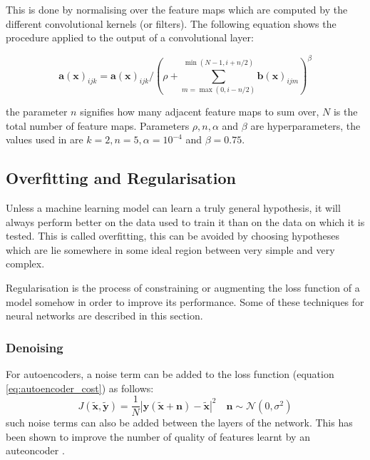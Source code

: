     This is done by normalising over the feature maps which are computed by the different convolutional kernels (or filters).
    The following equation shows the procedure applied to the output of a convolutional layer:

    \begin{equation} \label{eq:lrn}
      \mathbf{a}(\mathbf{x})_{ijk}
      = \mathbf{a}(\mathbf{x})_{ijk}/\left (\rho + \sum^{\min(N-1,i+n/2)}_{m=\max(0,i-n/2)}\mathbf{b}(\mathbf{x})_{ijm} \right )^\beta
    \end{equation}

    the parameter $n$ signifies how many adjacent feature maps to sum over, $N$ is the total number of feature maps.
    Parameters $\rho,n,\alpha$ and $\beta$ are hyperparameters, the values used in \cite{Krizhevsky2012} are
    $k=2,n=5,\alpha=10^{-4}$ and $\beta=0.75$.

  \subsection{Overfitting and Regularisation}
    Unless a machine learning model can learn a truly general hypothesis, it will always perform
    better on the data used to train it than on the data on which it is tested. This is
    called overfitting, this can be avoided by choosing hypotheses which are lie somewhere
    in some ideal region between very simple and very complex.

    Regularisation is the process of constraining or augmenting
    the loss function of a model \cite{Bishop2006} somehow in order to improve its performance.
    Some of these techniques for neural networks are described in this section.
    \subsubsection{Denoising}
      For autoencoders, a noise term can be added to the loss function (equation \ref{eq:autoencoder_cost}) as follows:
      \begin{equation} \label{eq:autoencoder_cost_noise}
        J(\tilde{\mathbf{x}},\tilde{\mathbf{y}}) = \frac{1}{N}\left |\mathbf{y}(\tilde{\mathbf{x}}+\mathbf{n})-\tilde{\mathbf{x}}\right | ^2\quad \mathbf{n} \sim \mathbf{\mathcal{N}}(0,\sigma^2)
      \end{equation}
      such noise terms can also be added between the layers of the network. This
      has been shown to improve the number of quality of features learnt by an auteoncoder \cite{stacks,Vincent2008a}.
